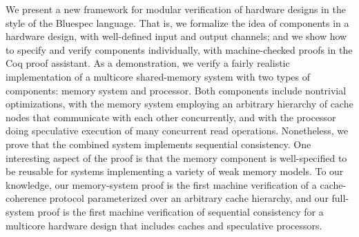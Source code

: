 We present a new framework for modular verification of hardware designs in the
style of the Bluespec language.  That is, we formalize the idea of components
in a hardware design, with well-defined input and output channels; and we show
how to specify and verify components individually, with machine-checked proofs
in the Coq proof assistant.  As a demonstration, we verify a fairly realistic
implementation of a multicore shared-memory system with two types of
components: memory system and processor.  Both components include nontrivial
optimizations, with the memory system employing an arbitrary hierarchy of cache
nodes that communicate with each other concurrently, and with the processor
doing speculative execution of many concurrent read operations.  Nonetheless,
we prove that the combined system implements sequential consistency.  One
interesting aspect of the proof is that the memory component is well-specified
to be reusable for systems implementing a variety of weak memory models.  To
our knowledge, our memory-system proof is the first machine verification
of a cache-coherence protocol parameterized over an arbitrary cache hierarchy,
and our full-system proof is the first machine verification of sequential
consistency for a multicore hardware design that includes caches and
speculative processors.


